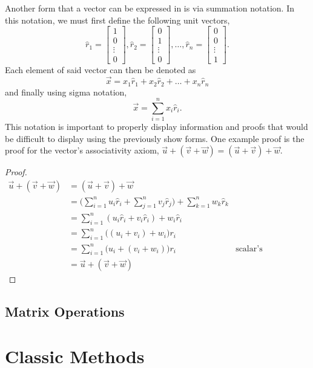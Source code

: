 \documentclass{article}
\begin{document}
Another form that a vector can be expressed in is via summation notation. In this notation, we must first define the following unit vectors, $$\hat{r}_1=\begin{bmatrix}1 \\ 0 \\ \vdots \\ 0\end{bmatrix},\hat{r}_2=\begin{bmatrix}0 \\ 1 \\ \vdots \\ 0\end{bmatrix},\dots,\hat{r}_n=\begin{bmatrix}0 \\ 0 \\ \vdots \\ 1\end{bmatrix} .$$ Each element of said vector can then be denoted as $$\vec{x}=x_1 \hat{r}_1 + x_2 \hat{r}_2 + \dots + x_n \hat{r}_n$$ and finally using sigma notation, $$\vec{x}=\sum_{i=1}^n x_i \hat{r}_i.$$ This notation is important to properly display information and proofs that would be difficult to display using the previously show forms. One example proof is the proof for the vector's associativity axiom, $\vec{u}+(\vec{v}+\vec{w})=(\vec{u}+\vec{v})+\vec{w}$.
\begin{proof}
\begin{align*}
\vec{u}+(\vec{v}+\vec{w})&=(\vec{u}+\vec{v})+\vec{w} \\
&=\bigg(\sum_{i=1}^nu_i \hat{r}_i+\sum_{j=1}^n v_j \hat{r}_j\bigg)+\sum_{k=1}^n w_k \hat{r}_k\\
&=\sum_{i=1}^n (u_i\hat{r}_i + v_i\hat{r}_i) + w_i\hat{r}_i\\
&=\sum_{i=1}^n \big((u_i + v_i) + w_i\big)r_i\\
&=\sum_{i=1}^n \big(u_i+(v_i+w_i)\big)r_i&\text{scalar's associativity}\\
&=\vec{u}+(\vec{v}+\vec{w})
\end{align*}
\end{proof}

\subsection{Matrix Operations}


\section{Classic Methods}
\end{document}
